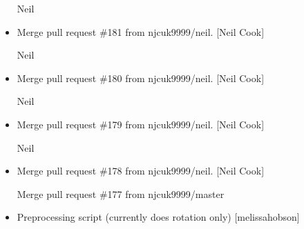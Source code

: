 \documentclass[a4paper,10pt,english]{report}
\begin{document}
\begin{itemize}
Neil

\item {} 
Merge pull request \#181 from njcuk9999/neil. {[}Neil Cook{]}

Neil

\item {} 
Merge pull request \#180 from njcuk9999/neil. {[}Neil Cook{]}

Neil

\item {} 
Merge pull request \#179 from njcuk9999/neil. {[}Neil Cook{]}

Neil

\item {} 
Merge pull request \#178 from njcuk9999/neil. {[}Neil Cook{]}

Merge pull request \#177 from njcuk9999/master

\item {} 
Preprocessing script (currently does rotation only) {[}melissa\sphinxhyphen{}hobson{]}

\end{itemize}
\end{document}
